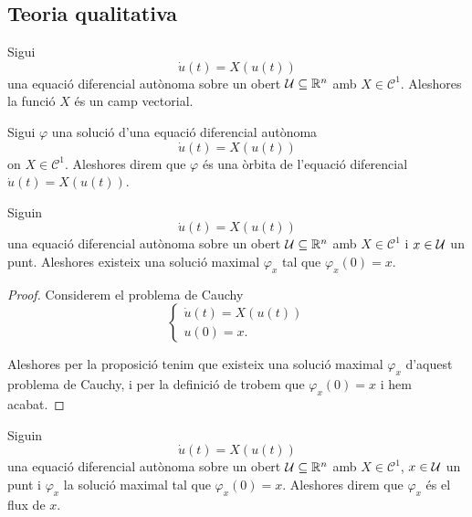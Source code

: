 \documentclass[../Apunts.tex]{subfiles}
\begin{document}
	\subsection{Teoria qualitativa}
	\begin{observation}
		\label{obs:podem entendre les equacions diferencials autònomes com camps vectorials}
		Sigui
		\[\dot{u}(t)=X(u(t))\]
		una equació diferencial autònoma sobre un obert \(\mathcal{U}\subseteq\mathbb{R}^{n}\) amb \(X\in\mathcal{C}^{1}\). Aleshores la funció \(X\) és un camp vectorial.
	\end{observation}
	\begin{definition}[Òrbites]
		\label{def:òrbita d'una equació diferencial}
		Sigui \(\varphi\) una solució d'una equació diferencial autònoma
		\[\dot{u}(t)=X(u(t))\]
		on \(X\in\mathcal{C}^{1}\). Aleshores direm que \(\varphi\) és una òrbita de l'equació diferencial \(\dot{u}(t)=X(u(t))\).
%		
%		
	\end{definition}
	\begin{proposition}
		Siguin
		\[\dot{u}(t)=X(u(t))\]
		una equació diferencial autònoma sobre un obert \(\mathcal{U}\subseteq\mathbb{R}^{n}\) amb \(X\in\mathcal{C}^{1}\) i \(x\in\mathcal{U}\) un punt. Aleshores existeix una solució maximal \(\varphi_{x}\) tal que \(\varphi_{x}(0)=x\).
		\begin{proof}
			Considerem el problema de Cauchy
			\[\begin{cases*}
				\displaystyle \dot{u}(t)=X(u(t)) \\
				\displaystyle u(0)=x.
			\end{cases*}\]
			
			Aleshores per la proposició  tenim que existeix una solució maximal \(\varphi_{x}\) d'aquest problema de Cauchy, i per la definició de  trobem que \(\varphi_{x}(0)=x\) i hem acabat.
		\end{proof}
	\end{proposition}
	\begin{definition}[Flux]
		\label{def:flux}
		Siguin
		\[\dot{u}(t)=X(u(t))\]
		una equació diferencial autònoma sobre un obert \(\mathcal{U}\subseteq\mathbb{R}^{n}\) amb \(X\in\mathcal{C}^{1}\), \(x\in\mathcal{U}\) un punt i \(\varphi_{x}\) la solució maximal tal que \(\varphi_{x}(0)=x\). Aleshores direm que \(\varphi_{x}\) és el flux de \(x\).
	\end{definition}
	
	
\end{document}
